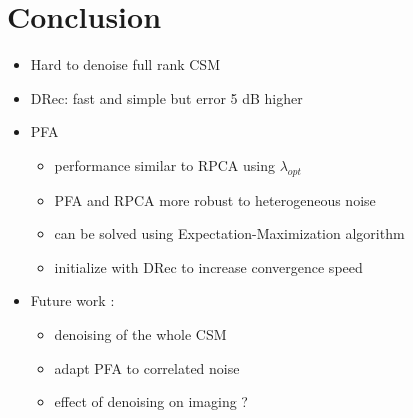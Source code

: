 \documentclass[10pt,xcolor=x11names,compress, notes=show]{beamer}%
\begin{document}
\section*{Conclusion}
\begin{frame}{\insertsectionhead}
	\begin{itemize}
		\item Hard to denoise full rank CSM
		\item DRec: fast and simple but error 5 dB higher
		\vfill
		\item PFA 
		\begin{itemize}
		        \item performance similar to RPCA using $\lambda_{opt}$
			\item PFA and RPCA more robust to heterogeneous noise	
			\item can be solved using Expectation-Maximization algorithm
			\item initialize with DRec  to increase convergence speed
		\end{itemize}
		\vfill
		\item Future work : 
		\begin{itemize}
		        \item denoising of the whole CSM
		        \item adapt PFA to correlated noise
		        \item effect of denoising on imaging ?
		\end{itemize}
	\end{itemize}
\end{frame}
\end{document}
